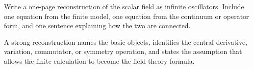 \begin{exercise}
Write a one-page reconstruction of the scalar field as infinite oscillators.  Include one equation from the finite model, one equation from the continuum or operator form, and one sentence explaining how the two are connected.
\begin{answer}
A strong reconstruction names the basic objects, identifies the central derivative, variation, commutator, or symmetry operation, and states the assumption that allows the finite calculation to become the field-theory formula.
\end{answer}
\end{exercise}
